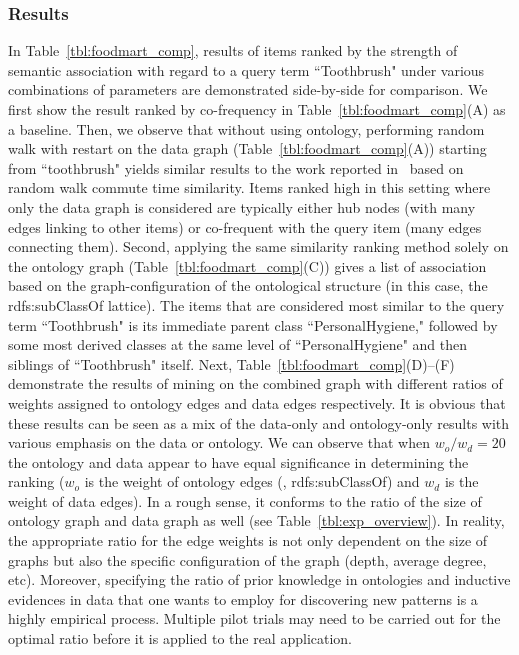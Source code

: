 \subsubsection{Results}
In Table~\ref{tbl:foodmart_comp}, results of items ranked by the strength of semantic association with regard to a query term ``Toothbrush" under various combinations of parameters are demonstrated side-by-side for comparison. We first show the result ranked by co-frequency in Table~\ref{tbl:foodmart_comp}(A) as a baseline. Then, we observe that without using ontology, performing random walk with restart on the data graph (Table~\ref{tbl:foodmart_comp}(A)) starting from ``toothbrush" yields similar results to the work reported in~\cite{LiuEtal11} based on random walk commute time similarity. Items ranked high in this setting where only the data graph is considered are typically either hub nodes (with many edges linking to other items) or co-frequent with the query item (many edges connecting them). Second, applying the same similarity ranking method solely on the ontology graph (Table~\ref{tbl:foodmart_comp}(C)) gives a list of association based on the graph-configuration of the ontological structure (in this case, the rdfs:subClassOf lattice). The items that are considered most similar to the query term ``Toothbrush" is its immediate parent class ``PersonalHygiene," followed by some most derived classes at the same level of ``PersonalHygiene" and then siblings of ``Toothbrush" itself. Next, Table~\ref{tbl:foodmart_comp}(D)--(F) demonstrate the results of mining on the combined graph with different ratios of weights assigned to ontology edges and data edges respectively. It is obvious that these results can be seen as a mix of the data-only and ontology-only results with various emphasis on the data or ontology. We can observe that when $w_o/w_d=20$ the ontology and data appear to have equal significance in determining the ranking ($w_o$ is the weight of ontology edges (\ie, rdfs:subClassOf) and $w_d$ is the weight of data edges). In a rough sense, it conforms to the ratio of the size of ontology graph and data graph as well (see Table~\ref{tbl:exp_overview}). In reality, the appropriate ratio for the edge weights is not only dependent on the size of graphs but also the specific configuration of the graph (depth, average degree, etc). Moreover, specifying the ratio of prior knowledge in ontologies and inductive evidences in data that one wants to employ for discovering new patterns is a highly empirical process. Multiple pilot trials may need to be carried out for the optimal ratio before it is applied to the real application.

